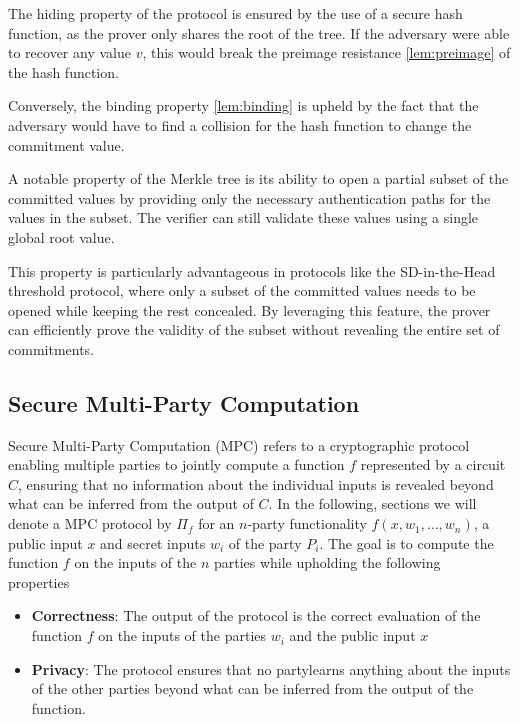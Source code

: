 \documentclass[twoside,11pt]{report}
\theoremstyle{definition}
\theoremstyle{plain}
\begin{document}
The hiding property of the protocol is ensured by the use of a secure hash function, as the prover only shares the root of the tree. If the adversary were able to recover any value $v$, this would break the preimage resistance \autoref{lem:preimage} of the hash function.

Conversely, the binding property \autoref{lem:binding} is upheld by the fact that the adversary would have to find a collision for the hash function to change the commitment value.

A notable property of the Merkle tree is its ability to open a partial subset of the committed values by providing only the necessary authentication paths for the values in the subset. The verifier can still validate these values using a single global root value.

This property is particularly advantageous in protocols like the SD-in-the-Head threshold protocol, where only a subset of the committed values needs to be opened while keeping the rest concealed. By leveraging this feature, the prover can efficiently prove the validity of the subset without revealing the entire set of commitments.

\subsection{Secure Multi-Party Computation}\label{sec:mpc}

Secure Multi-Party Computation (MPC) refers to a cryptographic protocol enabling multiple parties to jointly compute a function $f$ represented by a circuit $C$, ensuring that no information about the individual inputs is revealed beyond what can be inferred from the output of $C$. In the following, sections we will denote a MPC protocol by $\Pi_f$ for an $n$-party functionality $f(x, w_1, \dots, w_n)$, a public input $x$ and secret inputs $w_i$ of the party $P_i$. The goal is to compute the function $f$ on the inputs of the $n$ parties while upholding the following properties~\cite{cramer2015secure}

\begin{itemize}
  \item \textbf{Correctness}: The output of the protocol is the correct evaluation of the function $f$ on the inputs of the parties $w_i$ and the public input $x$
  \item \textbf{Privacy}: The protocol ensures that no partylearns anything about the inputs of the other parties beyond what can be inferred from the output of the function.
\end{itemize}
\end{document}
